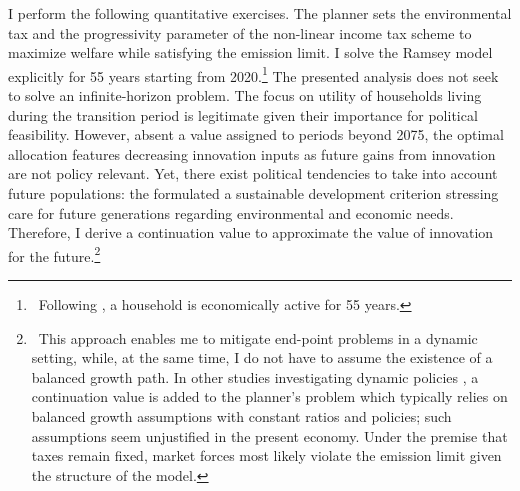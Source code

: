 I perform the following quantitative exercises. 
 The planner sets the environmental tax and the progressivity parameter of the non-linear income tax scheme to maximize welfare while satisfying the emission limit. %
I solve the Ramsey model explicitly for 55 years starting from 2020.\footnote{\ Following \cite{Kotlikoff2021MakingWin}, a household is economically active for 55 years. } The presented analysis does not seek to solve an infinite-horizon problem. The focus on utility of households living during the transition period is legitimate given their importance for political feasibility.
However, absent a value assigned to periods beyond 2075, the optimal allocation features decreasing innovation inputs as future gains from innovation are not policy relevant.
Yet, there exist political tendencies to take into account future populations:  the \cite{UNSUS} formulated a sustainable development criterion stressing care for future generations regarding environmental and economic needs. 
Therefore, I derive a continuation value to approximate the value of innovation for the future.\footnote{\ This approach enables me to mitigate end-point problems in a dynamic setting, while, at the same time, I do not have to assume the existence of a balanced growth path. 
 In other studies investigating dynamic policies \citep{Jones1993OptimalGrowth, Barrage2019OptimalPolicy}, %
a continuation value is added to the planner's problem which typically relies on balanced growth assumptions with constant ratios and policies; such assumptions seem unjustified  in the present economy.
Under the premise that taxes remain fixed, market forces most likely violate the emission limit given the structure of the model. }

